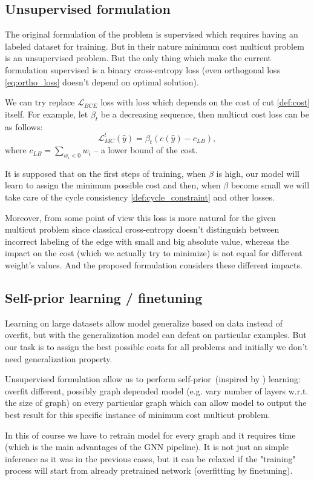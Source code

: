 \documentclass[10pt, twocolumn, a4paper]{article}
\theoremstyle{definition}
\begin{document}
\subsection{Unsupervised formulation}
The original formulation of the problem is supervised which requires having
an labeled dataset for training. But in their nature minimum cost multicut problem is an
unsupervised problem. But the only thing which make the current formulation supervised is
a binary cross-entropy loss (even orthogonal loss \eqref{eq:ortho_loss} doesn't depend on optimal solution).

We can try replace $\mathcal{L}_{BCE}$ loss with
loss which depends on the cost of cut \eqref{def:cost} itself. For example, let $\beta_t$ be
a decreasing sequence, then multicut cost loss can be as follows:
\[
    \mathcal{L}_{MC}^{t} (\hat{y}) = \beta_t \left( c(\hat{y}) - c_{LB} \right),
\]
where $c_{LB} = \sum\limits_{w_i < 0} w_i$ -- a lower bound of the cost.

It is supposed that on the first steps of training, when $\beta$ is high, our model will learn to
assign the minimum possible cost and then, when $\beta$ become small we will take care of the cycle
consistency \eqref{def:cycle_constraint} and other losses.

Moreover, from some point of view this loss is more natural for the given multicut problem since
classical cross-entropy doesn't distinguish between incorrect labeling of the edge with
small and big absolute value, whereas the impact on the cost (which we actually try to minimize)
is not equal for different weight's values. And the proposed formulation considers these different impacts.

\subsection{Self-prior learning / finetuning}
Learning on large datasets allow model generalize
based on data instead of overfit,
but with the generalization model can defeat on particular examples.
But our task is to assign the best possible costs for all problems and
initially we don't need generalization property.

Unsupervised formulation allow us to perform self-prior~(inspired by \citet{Hanocka2020p2m})
learning: overfit different, possibly graph depended model (e.g. vary
number of layers w.r.t. the size of graph) on every particular graph which
can allow model to output the best result for this specific instance of minimum cost multicut problem.

In this of course we have to retrain model for every
graph and it requires time (which is the main advantages of the GNN pipeline).
It is not just an simple inference as it was in the previous cases, but it can be
relaxed if the "training" process will start from already pretrained
network (overfitting by finetuning).



\end{document}
